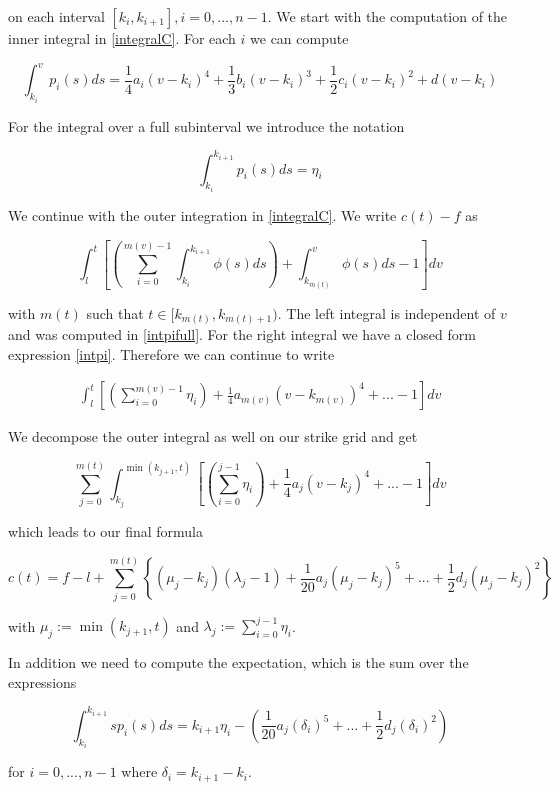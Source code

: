 \documentclass{amsart}
\theoremstyle{plain}
\numberwithin{equation}{section}
\begin{document}
on each interval $[k_i,k_{i+1}], i=0,...,n-1$. We start with the computation of the inner integral in \ref{integralC}. For each $i$ we can compute

\begin{equation}\label{intpi}
\int_{k_i}^{v} p_i(s) ds = \frac{1}{4}a_i(v-k_i)^4 + \frac{1}{3} b_i (v-k_i)^3 + \frac{1}{2} c_i (v-k_i)^2 + d(v-k_i)
\end{equation}

For the integral over a full subinterval we introduce the notation

\begin{equation}\label{intpifull}
\int_{k_i}^{k_{i+1}} p_i(s) ds = \eta_{i}
\end{equation}

We continue with the outer integration in \ref{integralC}. We write $c(t)-f$ as

\begin{equation}
\int_{l}^{t} \left[ \left( \sum_{i=0}^{m(v)-1} \int_{k_i}^{k_{i+1}} \phi(s) ds \right) + \int_{k_{m(t)}}^v \phi(s) ds - 1 \right] dv
\end{equation}

with $m(t)$ such that $t \in [k_{m(t)} , k_{m(t)+1} )$. The left integral is independent of $v$ and was computed in \ref{intpifull}.  For the right integral we have a closed form expression \ref{intpi}. Therefore we can continue to write

\begin{eqnarray}
\int_{l}^{t} \left[ \left( \sum_{i=0}^{m(v)-1} \eta_i \right) + \frac{1}{4}a_{m(v)}(v-k_{m(v)})^4 + ... - 1 \right] dv
\end{eqnarray}

We decompose the outer integral as well on our strike grid and get 

\begin{equation}
\sum_{j=0}^{m(t)} \int_{k_j}^{\min(k_{j+1},t)} \left[\left( \sum_{i=0}^{j-1} \eta_i \right) + \frac{1}{4}a_{j}(v-k_{j})^4 + ... -1 \right] dv
\end{equation}

which leads to our final formula

\begin{equation}
c(t) = f - l + \sum_{j=0}^{m(t)} \left\{ (\mu_j-k_j) \left( \lambda_j -1 \right) + \frac{1}{20}a_j(\mu_j-k_j)^5 + ... + \frac{1}{2}d_j(\mu_j-k_j)^2 \right\}
\end{equation}

with $\mu_j := \min(k_{j+1},t)$ and $\lambda_j := \sum_{i=0}^{j-1} \eta_i$.

In addition we need to compute the expectation, which is the sum over the expressions

\begin{equation}
\int_{k_i}^{k_{i+1}} s p_i(s) ds = k_{i+1} \eta_i - \left( \frac{1}{20}a_j(\delta_i)^5 + ... + \frac{1}{2}d_j(\delta_i)^2\right)
\end{equation}

for $i=0,...,n-1$ where $\delta_i = k_{i+1} - k_i$.


\begin{thebibliography}{0}

\end{thebibliography}
\end{document}
